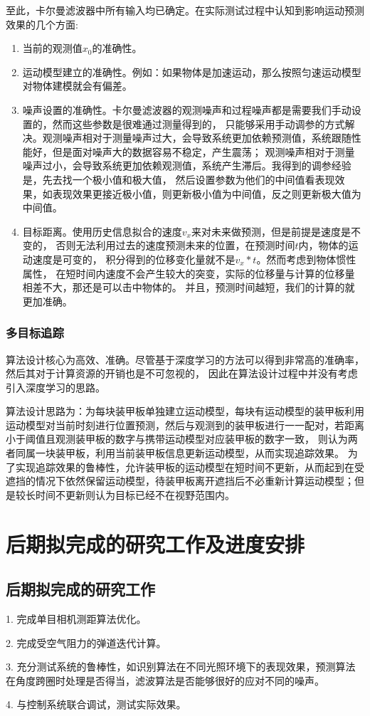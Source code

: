 至此，卡尔曼滤波器中所有输入均已确定。在实际测试过程中认知到影响运动预测效果的几个方面:
\begin{enumerate}[itemsep=2pt,topsep=0pt,parsep=0pt]
    \item 当前的观测值$x_0$的准确性。
    \item 运动模型建立的准确性。例如：如果物体是加速运动，那么按照匀速运动模型对物体建模就会有偏差。
    \item 噪声设置的准确性。卡尔曼滤波器的观测噪声和过程噪声都是需要我们手动设置的，然而这些参数是很难通过测量得到的，
    只能够采用手动调参的方式解决。观测噪声相对于测量噪声过大，会导致系统更加依赖预测值，系统跟随性能好，但是面对噪声大的数据容易不稳定，产生震荡；
    观测噪声相对于测量噪声过小，会导致系统更加依赖观测值，系统产生滞后。我得到的调参经验是，先去找一个极小值和极大值，
    然后设置参数为他们的中间值看表现效果，如表现效果更接近极小值，则更新极小值为中间值，反之则更新极大值为中间值。
    \item 目标距离。使用历史信息拟合的速度$v_x$来对未来做预测，但是前提是速度是不变的，
    否则无法利用过去的速度预测未来的位置，在预测时间$t$内，物体的运动速度是可变的，
    积分得到的位移变化量就不是$v_x*t$。然而考虑到物体惯性属性，
    在短时间内速度不会产生较大的突变，实际的位移量与计算的位移量相差不大，那还是可以击中物体的。
    并且，预测时间越短，我们的计算的就更加准确。
\end{enumerate}

\subsubsection{多目标追踪}
算法设计核心为高效、准确。尽管基于深度学习的方法可以得到非常高的准确率，然后其对于计算资源的开销也是不可忽视的，
因此在算法设计过程中并没有考虑引入深度学习的思路。\par
算法设计思路为：为每块装甲板单独建立运动模型，每块有运动模型的装甲板利用运动模型对当前时刻进行位置预测，然后与观测到的装甲板进行一一配对，若距离小于阈值且观测装甲板的数字与携带运动模型对应装甲板的数字一致，
则认为两者同属一块装甲板，利用当前装甲板信息更新运动模型，从而实现追踪效果。
为了实现追踪效果的鲁棒性，允许装甲板的运动模型在短时间不更新，从而起到在受遮挡的情况下依然保留运动模型，待装甲板离开遮挡后不必重新计算运动模型；但是较长时间不更新则认为目标已经不在视野范围内。

\section{后期拟完成的研究工作及进度安排}
\subsection{后期拟完成的研究工作}
1. 完成单目相机测距算法优化。\par
2. 完成受空气阻力的弹道迭代计算。\par
3. 充分测试系统的鲁棒性，如识别算法在不同光照环境下的表现效果，预测算法在角度跨圈时处理是否得当，滤波算法是否能够很好的应对不同的噪声。\par
4. 与控制系统联合调试，测试实际效果。\par
